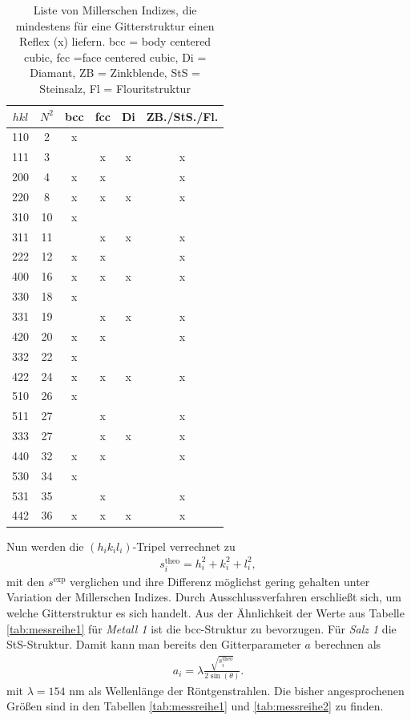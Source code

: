 \begin{table}[t]
\begin{tabular}{cc|cccc}
 $hkl$&$N^2$& bcc & fcc & Di & ZB./StS./Fl.\\
 \hline
 110&2&x&&&\\
 111&3&&x&x&x\\
 200&4&x&x&&x\\
 220&8&x&x&x&x\\
 310&10&x&&&\\
 311&11&&x&x&x\\
 222&12&x&x&&x\\
 400&16&x&x&x&x\\
 330&18&x&&&\\
 331&19&&x&x&x\\
 420&20&x&x&&x\\
 332&22&x&&&\\
 422&24&x&x&x&x\\
 510&26&x&&&\\
 511&27&&x&&x\\
 333&27&&x&x&x\\
 440&32&x&x&&x\\
 530&34&x&&&\\
 531&35&&x&&x\\
 442&36&x&x&x&x\\
\end{tabular}
\caption{Liste von Millerschen Indizes, die mindestens für eine Gitterstruktur einen Reflex (x) liefern. bcc = body centered cubic, fcc =face centered cubic,
 Di = Diamant, ZB = Zinkblende, StS = Steinsalz, Fl = Flouritstruktur}
\label{tab:hklstrukturen}
\end{table}
\noindent  Nun werden die $(h_ik_il_i)$-Tripel
verrechnet zu
\begin{align}
 s^\text{theo}_i = h_i^2 + k_i^2 + l_i^2,
 \label{eq:structTheo}
\end{align}
mit den $s^\text{exp}$ verglichen und ihre Differenz möglichst gering gehalten unter Variation der Millerschen Indizes. Durch Ausschlussverfahren 
erschließt sich, um welche Gitterstruktur es sich handelt. Aus der Ähnlichkeit der Werte
aus Tabelle \ref{tab:messreihe1} für \textit{Metall 1} ist die bcc-Struktur zu bevorzugen. Für \textit{Salz 1} die StS-Struktur.
Damit kann man bereits den Gitterparameter $a$ berechnen als
\begin{align}
 a_i = \lambda\frac{\sqrt{s^\text{theo}_i}}{2\sin(\theta)}.
 \label{eq:gitterparameter}
\end{align}
mit $\lambda=154$ nm als Wellenlänge der Röntgenstrahlen. Die bisher angesprochenen Größen sind in den Tabellen 
\ref{tab:messreihe1} und \ref{tab:messreihe2} zu finden.

